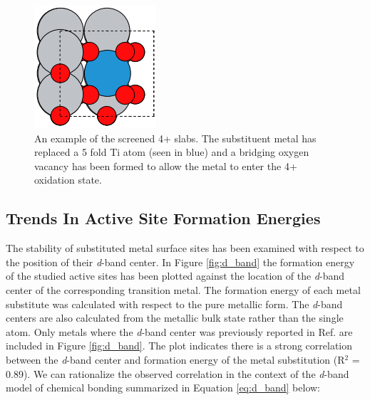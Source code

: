 \begin{figure}
    \centering
    \includegraphics[width=0.5\linewidth]{Images/ex_4+_slab.png}
    \caption{An example of the screened 4+ slabs. The substituent metal has replaced a 5 fold Ti atom (seen in blue) and a bridging oxygen vacancy has been formed to allow the metal to enter the 4+ oxidation state.}
    \label{fig:2+ex_slab}
\end{figure}



\subsection{Trends In Active Site Formation Energies}

The stability of substituted metal surface sites has been examined with respect to the position of their \textit{d}-band center. In Figure \ref{fig:d_band} the formation energy of the studied active sites has been plotted against the location of the \textit{d}-band center of the corresponding transition metal. The formation energy of each metal substitute was calculated with respect to the pure metallic form. The \textit{d}-band centers are also calculated from the metallic bulk state rather than the single atom. Only metals where the \textit{d}-band center was previously reported in Ref.  are included in Figure \ref{fig:d_band}. The plot indicates there is a strong correlation between the \textit{d}-band center and formation energy of the metal substitution (R$^2$ = 0.89). We can rationalize the observed correlation in the context of the \textit{d}-band model of chemical bonding \cite{Hammer_1995, Nilsson_2008} summarized in Equation \ref{eq:d_band} below:


